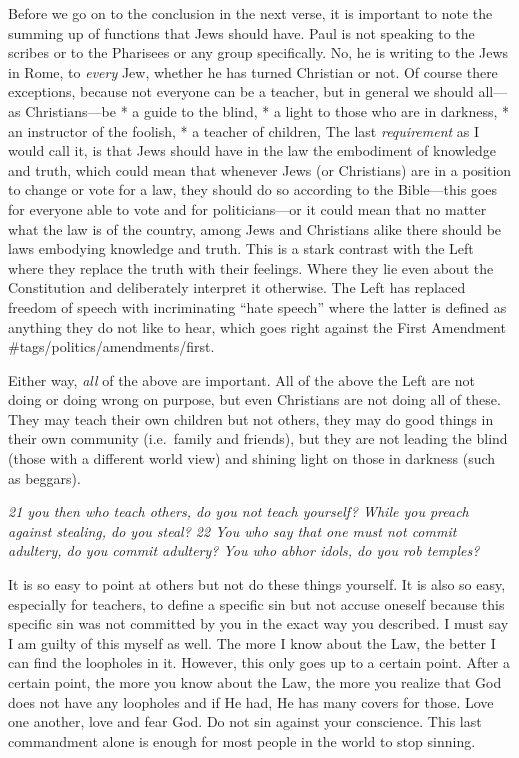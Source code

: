 Before we go on to the conclusion in the next verse, it is important to
note the summing up of functions that Jews should have. Paul is not
speaking to the scribes or to the Pharisees or any group specifically.
No, he is writing to the Jews in Rome, to \emph{every} Jew, whether he
has turned Christian or not. Of course there exceptions, because not
everyone can be a teacher, but in general we should all---as
Christians---be * a guide to the blind, * a light to those who are in
darkness, * an instructor of the foolish, * a teacher of children, The
last \emph{requirement} as I would call it, is that Jews should have in
the law the embodiment of knowledge and truth, which could mean that
whenever Jews (or Christians) are in a position to change or vote for a
law, they should do so according to the Bible---this goes for everyone
able to vote and for politicians---or it could mean that no matter what
the law is of the country, among Jews and Christians alike there should
be laws embodying knowledge and truth. This is a stark contrast with the
Left where they replace the truth with their feelings. Where they lie
even about the Constitution and deliberately interpret it otherwise. The
Left has replaced freedom of speech with incriminating ``hate speech''
where the latter is defined as anything they do not like to hear, which
goes right against the First Amendment \#tags/politics/amendments/first.

Either way, \emph{all} of the above are important. All of the above the
Left are not doing or doing wrong on purpose, but even Christians are
not doing all of these. They may teach their own children but not
others, they may do good things in their own community (i.e.~family and
friends), but they are not leading the blind (those with a different
world view) and shining light on those in darkness (such as beggars).

\emph{21 you then who teach others, do you not teach yourself? While you
preach against stealing, do you steal? 22 You who say that one must not
commit adultery, do you commit adultery? You who abhor idols, do you rob
temples?}

It is so easy to point at others but not do these things yourself. It is
also so easy, especially for teachers, to define a specific sin but not
accuse oneself because this specific sin was not committed by you in the
exact way you described. I must say I am guilty of this myself as well.
The more I know about the Law, the better I can find the loopholes in
it. However, this only goes up to a certain point. After a certain
point, the more you know about the Law, the more you realize that God
does not have any loopholes and if He had, He has many covers for those.
Love one another, love and fear God. Do not sin against your conscience.
This last commandment alone is enough for most people in the world to
stop sinning.

